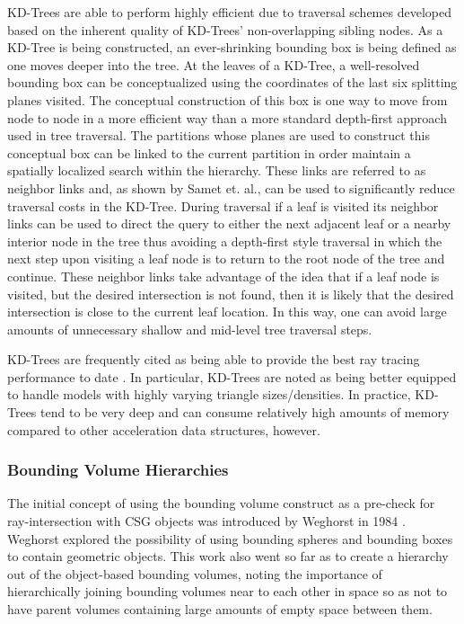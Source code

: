 KD-Trees are able to perform highly efficient due to traversal schemes developed
based on the inherent quality of KD-Trees' non-overlapping sibling nodes. As a
KD-Tree is being constructed, an ever-shrinking bounding box is being defined as
one moves deeper into the tree. At the leaves of a KD-Tree, a well-resolved
bounding box can be conceptualized using the coordinates of the last six
splitting planes visited. The conceptual construction of this box is one way to
move from node to node in a more efficient way than a more standard depth-first
approach used in tree traversal. The partitions whose planes are used to
construct this conceptual box can be linked to the current partition in order
maintain a spatially localized search within the hierarchy. These links are
referred to as neighbor links and, as shown by Samet et. al.\cite{Samet_1989},
can be used to significantly reduce traversal costs in the KD-Tree. During
traversal if a leaf is visited its neighbor links can be used to direct the
query to either the next adjacent leaf or a nearby interior node in the tree
thus avoiding a depth-first style traversal in which the next step upon visiting
a leaf node is to return to the root node of the tree and continue. These
neighbor links take advantage of the idea that if a leaf node is visited, but
the desired intersection is not found, then it is likely that the desired
intersection is close to the current leaf location. In this way, one can avoid
large amounts of unnecessary shallow and mid-level tree traversal steps.

KD-Trees are frequently cited as being able to provide the best ray tracing
performance to date \cite{Ernst_2007,Hurley_2002,Havran_2000}. In particular,
KD-Trees are noted as being better equipped to handle models with highly varying
triangle sizes/densities. In practice, KD-Trees tend to be very deep and can
consume relatively high amounts of memory compared to other acceleration data
structures, however. 

\subsubsection{Bounding Volume Hierarchies}%
\label{subsec:BVH}
The initial concept of using the bounding volume construct as a pre-check for
ray-intersection with CSG objects was introduced by Weghorst in 1984
\cite{Weghorst_1984}. Weghorst explored the possibility of using bounding
spheres and bounding boxes to contain geometric objects. This work also went so
far as to create a hierarchy out of the object-based bounding volumes, noting the
importance of hierarchically joining bounding volumes near to each other in space
so as not to have parent volumes containing large amounts of empty space between them.

